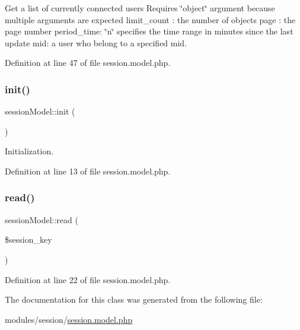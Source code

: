Get a list of currently connected users Requires \char`\"{}object\char`\"{} argument because multiple arguments are expected limit\+\_\+count \+: the number of objects page \+: the page number period\+\_\+time\+: \char`\"{}n\char`\"{} specifies the time range in minutes since the last update mid\+: a user who belong to a specified mid. 



Definition at line 47 of file session.\+model.\+php.

\hypertarget{classsessionModel_a860d5067061beadd0bc15d57df695dd8}{}\label{classsessionModel_a860d5067061beadd0bc15d57df695dd8} 
\subsubsection{\texorpdfstring{init()}{init()}}
{\footnotesize\ttfamily session\+Model\+::init (\begin{DoxyParamCaption}{ }\end{DoxyParamCaption})}



Initialization. 



Definition at line 13 of file session.\+model.\+php.

\hypertarget{classsessionModel_a1cae587d88bb84dc32c1c7b751b11528}{}\label{classsessionModel_a1cae587d88bb84dc32c1c7b751b11528} 
\subsubsection{\texorpdfstring{read()}{read()}}
{\footnotesize\ttfamily session\+Model\+::read (\begin{DoxyParamCaption}\item[{}]{\$session\+\_\+key }\end{DoxyParamCaption})}



Definition at line 22 of file session.\+model.\+php.



The documentation for this class was generated from the following file\+:\begin{DoxyCompactItemize}
\item 
modules/session/\hyperlink{session_8model_8php}{session.\+model.\+php}\end{DoxyCompactItemize}
